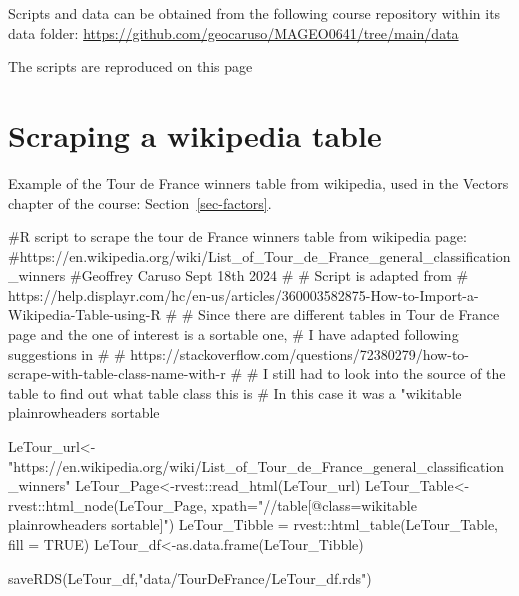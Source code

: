 \documentclass[
  letterpaper,
  DIV=11,
  numbers=noendperiod]{scrreprt}
\newenvironment{Shaded}{\begin{snugshade}}{\end{snugshade}}
\newcommand{\AttributeTok}[1]{\textcolor[rgb]{0.40,0.45,0.13}{#1}}
\newcommand{\CommentTok}[1]{\textcolor[rgb]{0.37,0.37,0.37}{#1}}
\newcommand{\ConstantTok}[1]{\textcolor[rgb]{0.56,0.35,0.01}{#1}}
\newcommand{\FunctionTok}[1]{\textcolor[rgb]{0.28,0.35,0.67}{#1}}
\newcommand{\NormalTok}[1]{\textcolor[rgb]{0.00,0.23,0.31}{#1}}
\newcommand{\OtherTok}[1]{\textcolor[rgb]{0.00,0.23,0.31}{#1}}
\newcommand{\SpecialCharTok}[1]{\textcolor[rgb]{0.37,0.37,0.37}{#1}}
\newcommand{\StringTok}[1]{\textcolor[rgb]{0.13,0.47,0.30}{#1}}
\begin{document}
Scripts and data can be obtained from the following course repository
within its data folder:
\url{https://github.com/geocaruso/MAGEO0641/tree/main/data}

The scripts are reproduced on this page

\section{Scraping a wikipedia table}\label{scraping-a-wikipedia-table}

Example of the Tour de France winners table from wikipedia, used in the
Vectors chapter of the course: Section~\ref{sec-factors}.

\begin{Shaded}
\begin{Highlighting}[]
\CommentTok{\#R script to scrape the tour de France winners table from wikipedia page:}
\CommentTok{\#https://en.wikipedia.org/wiki/List\_of\_Tour\_de\_France\_general\_classification\_winners}
\CommentTok{\#Geoffrey Caruso  Sept 18th 2024}
\CommentTok{\#}
\CommentTok{\# Script is adapted from}
\CommentTok{\# https://help.displayr.com/hc/en{-}us/articles/360003582875{-}How{-}to{-}Import{-}a{-}Wikipedia{-}Table{-}using{-}R}
\CommentTok{\# }
\CommentTok{\# Since there are different tables in Tour de France page and the one of interest is a sortable one,}
\CommentTok{\# I have adapted following suggestions in}
\CommentTok{\# }
\CommentTok{\# https://stackoverflow.com/questions/72380279/how{-}to{-}scrape{-}with{-}table{-}class{-}name{-}with{-}r}
\CommentTok{\# }
\CommentTok{\# I still had to look into the source of the table to find out what table class this is}
\CommentTok{\# In this case it was a "wikitable plainrowheaders sortable\textquotesingle{}}

\NormalTok{LeTour\_url}\OtherTok{\textless{}{-}}\StringTok{"https://en.wikipedia.org/wiki/List\_of\_Tour\_de\_France\_general\_classification\_winners"}
\NormalTok{LeTour\_Page}\OtherTok{\textless{}{-}}\NormalTok{rvest}\SpecialCharTok{::}\FunctionTok{read\_html}\NormalTok{(LeTour\_url)}
\NormalTok{LeTour\_Table}\OtherTok{\textless{}{-}}\NormalTok{rvest}\SpecialCharTok{::}\FunctionTok{html\_node}\NormalTok{(LeTour\_Page, }\AttributeTok{xpath=}\StringTok{"//table[@class=\textquotesingle{}wikitable plainrowheaders sortable\textquotesingle{}]"}\NormalTok{)}
\NormalTok{LeTour\_Tibble }\OtherTok{=}\NormalTok{ rvest}\SpecialCharTok{::}\FunctionTok{html\_table}\NormalTok{(LeTour\_Table, }\AttributeTok{fill =} \ConstantTok{TRUE}\NormalTok{)}
\NormalTok{LeTour\_df}\OtherTok{\textless{}{-}}\FunctionTok{as.data.frame}\NormalTok{(LeTour\_Tibble)}

\FunctionTok{saveRDS}\NormalTok{(LeTour\_df,}\StringTok{"data/TourDeFrance/LeTour\_df.rds"}\NormalTok{)}
\end{Highlighting}
\end{Shaded}
\end{document}

